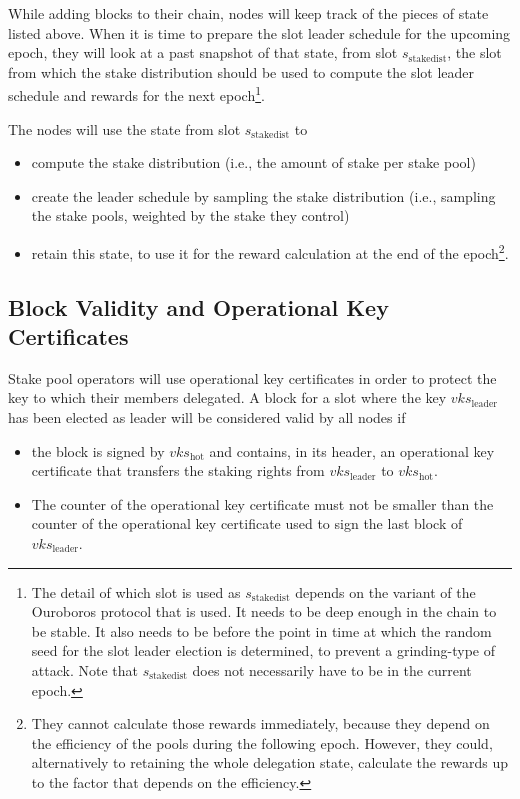 \documentclass[11pt,a4paper,dvipsnames,twosided]{article}
\begin{document}
While adding blocks to their chain, nodes will keep track of the
pieces of state listed above. When it is time to prepare the slot
leader schedule for the upcoming epoch, they will look at a past
snapshot of that state, from slot \(s_\text{stakedist}\), the slot
from which the stake distribution should be used to compute the slot
leader schedule and rewards for the next epoch\footnote{The detail of
  which slot is used as \(s_\text{stakedist}\) depends on the variant
  of the Ouroboros protocol that is used. It needs to be deep enough
  in the chain to be stable. It also needs to be before the point in
  time at which the random seed for the slot leader election is
  determined, to prevent a grinding-type of attack. Note that
  \(s_\text{stakedist}\) does not necessarily have to be in the
  current epoch.}.

The nodes will use the state from slot \(s_\text{stakedist}\) to
\begin{itemize}
\item compute the stake distribution (i.e., the amount of stake per
  stake pool)
\item create the leader schedule by sampling the stake distribution
  (i.e., sampling the stake pools, weighted by the stake they control)
\item retain this state, to use it for the reward calculation at the
  end of the epoch\footnote{They cannot calculate those rewards
    immediately, because they depend on the efficiency of the pools
    during the following epoch. However, they could, alternatively to
    retaining the whole delegation state, calculate the rewards up to
    the factor that depends on the efficiency.}.
\end{itemize}

\subsection{Block Validity and Operational Key Certificates}
\label{block-validity-and-operational-key-certificates}

Stake pool operators will use operational key certificates in order to protect
the key to which their members delegated. A block for a slot where the key
\(vks_\text{leader}\) has been elected as leader will be considered valid by all
nodes if

\begin{itemize}
\item
  the block is signed by \(vks_\text{hot}\) and contains, in its header, an
  operational key certificate that transfers the staking rights from
  \(vks_\text{leader}\) to \(vks_\text{hot}\).

\item
  The counter of the operational key certificate must not be smaller than the
  counter of the operational key certificate used to sign the last block of
  \(vks_\text{leader}\).
\end{itemize}
\end{document}
